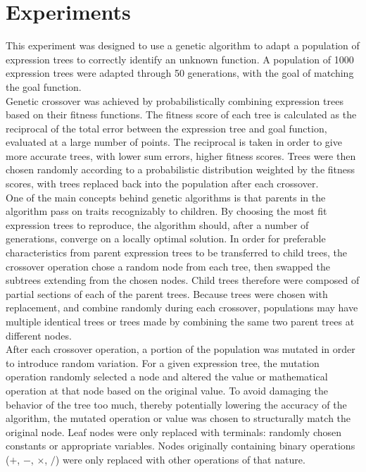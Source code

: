 
\section{Experiments}
\label{sec:expts}

This experiment was designed to use a genetic algorithm to adapt a population of expression trees to correctly identify an unknown function.  A population of 1000 expression trees were adapted through 50 generations, with the goal of matching the goal function. \\

Genetic crossover was achieved by probabilistically combining expression trees based on their fitness functions.  The fitness score of each tree is calculated as the reciprocal of the total error between the expression tree and goal function, evaluated at a large number of points.  The reciprocal is taken in order to give more accurate trees, with lower sum errors, higher fitness scores.  Trees were then chosen randomly according to a probabilistic distribution weighted by the fitness scores, with trees replaced back into the population after each crossover.\\

One of the main concepts behind genetic algorithms is that parents in the algorithm pass on traits recognizably to children.  By choosing the most fit expression trees to reproduce, the algorithm should, after a number of generations, converge on a locally optimal solution. In order for preferable characteristics from parent expression trees to be transferred to child trees, the crossover operation chose a random node from each tree, then swapped the subtrees extending from the chosen nodes.  Child trees therefore were composed of partial sections of each of the parent trees.  Because trees were chosen with replacement, and combine randomly during each crossover, populations may have multiple identical trees or trees made by combining the same two parent trees at different nodes. \\

After each crossover operation, a portion of the population was mutated in order to introduce random variation. For a given expression tree, the mutation operation randomly selected a node and altered the value or mathematical operation at that node based on the original value.  To avoid damaging the behavior of the tree too much, thereby potentially lowering the accuracy of the algorithm, the mutated operation or value was chosen to structurally match the original node.  Leaf nodes were only replaced with terminals: randomly chosen constants or appropriate variables.  Nodes originally containing binary operations ($+$, $-$, $\times$, $/$) were only replaced with other operations of that nature. \\


